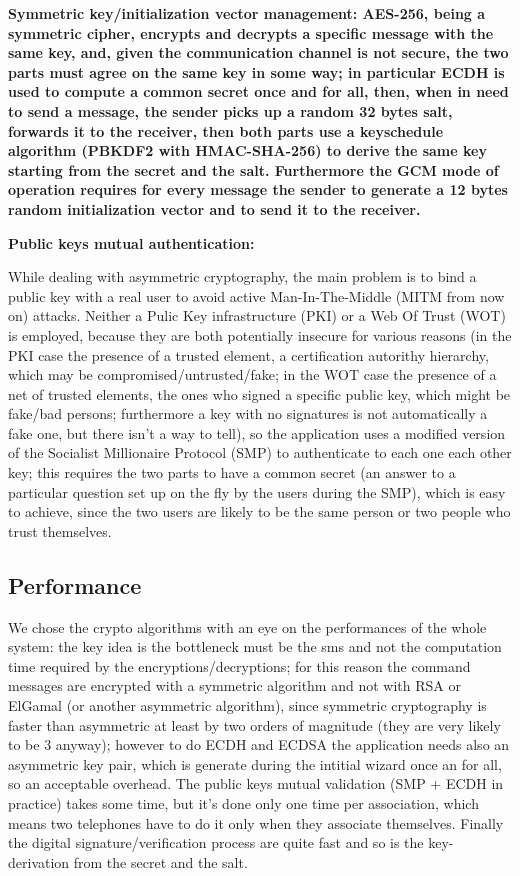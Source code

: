 \bfseries
Symmetric key/initialization vector management:
\normalfont
AES-256, being a symmetric cipher, encrypts and decrypts a specific message
with the same key, and, given the communication channel is not secure, the
two parts must agree on the same key in some way; in particular ECDH is
used to compute a common secret once and for all, then, when in need to
send a message, the sender picks up a random 32 bytes salt, forwards it to
the receiver, then both parts use a keyschedule algorithm (PBKDF2 with
HMAC-SHA-256) to derive the same key starting from the secret and the
salt. Furthermore the GCM mode of operation requires for every message the
sender to generate a 12 bytes random initialization vector and to send it to
the receiver.


\bfseries
Public keys mutual authentication:
\normalfont

While dealing with asymmetric cryptography, the main problem is to bind a
public key with a real user to avoid active Man-In-The-Middle (MITM from
now on) attacks. Neither a Pulic Key infrastructure (PKI) or a Web Of Trust
(WOT) is employed, because they are both potentially insecure for various
reasons (in the PKI case the presence of a trusted element, a certification
autorithy hierarchy, which may be compromised/untrusted/fake; in the WOT
case the presence of a net of trusted elements, the ones who signed a specific
public key, which might be fake/bad persons; furthermore a key with no
signatures is not automatically a fake one, but there isn’t a way to tell), so
the application uses a modified version of the Socialist Millionaire Protocol
(SMP) to authenticate to each one each other key; this requires the two parts
to have a common secret (an answer to a particular question set up on the fly
by the users during the SMP), which is easy to achieve, since the two users
are likely to be the same person or two people who trust themselves.

\subsection{Performance}

We chose the crypto algorithms with an eye on the performances of the
whole system: the key idea is the bottleneck must be the sms and not the
computation time required by the encryptions/decryptions; for this reason
the command messages are encrypted with a symmetric algorithm and not
with RSA or ElGamal (or another asymmetric algorithm), since symmetric
cryptography is faster than asymmetric at least by two orders of magnitude
(they are very likely to be 3 anyway); however to do ECDH and ECDSA
the application needs also an asymmetric key pair, which is generate during
the intitial wizard once an for all, so an acceptable overhead. The public
keys mutual validation (SMP + ECDH in practice) takes some time, but it’s
done only one time per association, which means two telephones have to do it
only when they associate themselves. Finally the digital signature/verification
process are quite fast and so is the key-derivation from the secret and the
salt.











